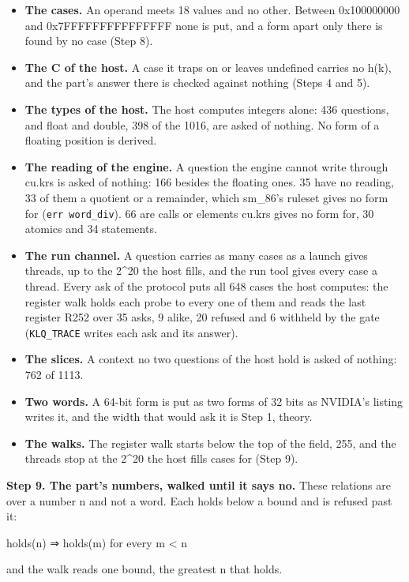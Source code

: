 \begin{itemize}
\item \textbf{The cases.} An operand meets 18 values and no other. Between 0x100000000 and 0x7FFFFFFFFFFFFFFF none is put, and a form apart only there is found by no case (Step 8).
\item \textbf{The C of the host.} A case it traps on or leaves undefined carries no h(k), and the part's answer there is checked against nothing (Steps 4 and 5).
\item \textbf{The types of the host.} The host computes integers alone: 436 questions, and float and double, 398 of the 1016, are asked of nothing. No form of a floating position is derived.
\item \textbf{The reading of the engine.} A question the engine cannot write through cu.krs is asked of nothing: 166 besides the floating ones. 35 have no reading, 33 of them a quotient or a remainder, which sm\_\allowbreak{}86's ruleset gives no form for (\texttt{err word\_\allowbreak{}div}). 66 are calls or elements cu.krs gives no form for, 30 atomics and 34 statements.
\item \textbf{The run channel.} A question carries as many cases as a launch gives threads, up to the 2\textasciicircum{}20 the host fills, and the run tool gives every case a thread. Every ask of the protocol puts all 648 cases the host computes: the register walk holds each probe to every one of them and reads the last register R252 over 35 asks, 9 alike, 20 refused and 6 withheld by the gate (\texttt{KLQ\_\allowbreak{}TRACE} writes each ask and its answer).
\item \textbf{The slices.} A context no two questions of the host hold is asked of nothing: 762 of 1113.
\item \textbf{Two words.} A 64-bit form is put as two forms of 32 bits as NVIDIA's listing writes it, and the width that would ask it is Step 1, theory.
\item \textbf{The walks.} The register walk starts below the top of the field, 255, and the threads stop at the 2\textasciicircum{}20 the host fills cases for (Step 9).
\end{itemize}

\textbf{Step 9. The part's numbers, walked until it says no.} These relations are over a number n and not a word. Each holds below a bound and is refused past it:

holds(n) ⇒ holds(m) for every m < n

and the walk reads one bound, the greatest n that holds.

